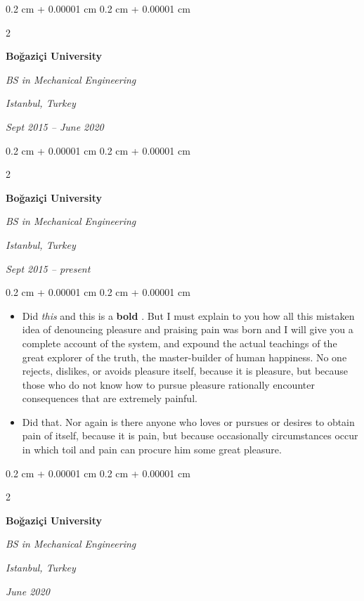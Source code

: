 \documentclass[10pt, letterpaper]{article}
\newenvironment{highlights}{
    \begin{itemize}[
        topsep=0.10 cm,
        parsep=0.10 cm,
        partopsep=0pt,
        itemsep=0pt,
        leftmargin=0.4 cm + 10pt
    ]
}{
    \end{itemize}
} %
\newenvironment{onecolentry}{
    \begin{adjustwidth}{
        0.2 cm + 0.00001 cm
    }{
        0.2 cm + 0.00001 cm
    }
}{
    \end{adjustwidth}
} %
\newenvironment{twocolentry}[2][]{
    \onecolentry
    \def\secondColumn{#2}
    \setcolumnwidth{\fill, 4.5 cm}
    \begin{paracol}{2}
}{
    \switchcolumn \raggedleft \secondColumn
    \end{paracol}
    \endonecolentry
} %
\let\hrefWithoutArrow\href
\renewcommand{\href}[2]{\hrefWithoutArrow{#1}{\ifthenelse{\equal{#2}{}}{ }{#2 }\raisebox{.15ex}{\footnotesize \faExternalLink*}}}
\begin{document}
        \vspace{0.2 cm}

        \begin{twocolentry}{
        \textit{Istanbul, Turkey}    
            
        \textit{Sept 2015 – June 2020}}
            \textbf{Boğaziçi University}

            \textit{BS in Mechanical Engineering}
        \end{twocolentry}



        \vspace{0.2 cm}

        \begin{twocolentry}{
        \textit{Istanbul, Turkey}    
            
        \textit{Sept 2015 – present}}
            \textbf{Boğaziçi University}

            \textit{BS in Mechanical Engineering}
        \end{twocolentry}

        \vspace{0.10 cm}
        \begin{onecolentry}
            \begin{highlights}
                \item Did \textit{this} and this is a \textbf{bold} \href{https://example.com}{link}. But I must explain to you how all this mistaken idea of denouncing pleasure and praising pain was born and I will give you a complete account of the system, and expound the actual teachings of the great explorer of the truth, the master-builder of human happiness. No one rejects, dislikes, or avoids pleasure itself, because it is pleasure, but because those who do not know how to pursue pleasure rationally encounter consequences that are extremely painful.
                \item Did that. Nor again is there anyone who loves or pursues or desires to obtain pain of itself, because it is pain, but because occasionally circumstances occur in which toil and pain can procure him some great pleasure.
            \end{highlights}
        \end{onecolentry}


        \vspace{0.2 cm}

        \begin{twocolentry}{
        \textit{Istanbul, Turkey}    
            
        \textit{June 2020}}
            \textbf{Boğaziçi University}

            \textit{BS in Mechanical Engineering}
        \end{twocolentry}
\end{document}
